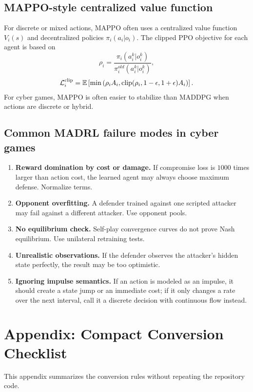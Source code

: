 \documentclass[11pt,a4paper]{article}
\begin{document}
\subsection{MAPPO-style centralized value function}
For discrete or mixed actions, MAPPO often uses a centralized value function $V_i(s)$ and decentralized policies $\pi_i(a_i|o_i)$. The clipped PPO objective for each agent is based on
\begin{equation}
\rho_i=\frac{\pi_i(a_i^k|o_i^k)}{\pi_i^{old}(a_i^k|o_i^k)},
\end{equation}
\begin{equation}
\mathcal{L}_{i}^{\mathrm{clip}}=\mathbb{E}\left[\min\left(\rho_i A_i,\operatorname{clip}(\rho_i,1-\epsilon,1+\epsilon)A_i\right)\right].
\end{equation}
For cyber games, MAPPO is often easier to stabilize than MADDPG when actions are discrete or hybrid.

\subsection{Common MADRL failure modes in cyber games}
\begin{enumerate}
\item \textbf{Reward domination by cost or damage.} If compromise loss is $1000$ times larger than action cost, the learned agent may always choose maximum defense. Normalize terms.
\item \textbf{Opponent overfitting.} A defender trained against one scripted attacker may fail against a different attacker. Use opponent pools.
\item \textbf{No equilibrium check.} Self-play convergence curves do not prove Nash equilibrium. Use unilateral retraining tests.
\item \textbf{Unrealistic observations.} If the defender observes the attacker's hidden state perfectly, the result may be too optimistic.
\item \textbf{Ignoring impulse semantics.} If an action is modeled as an impulse, it should create a state jump or an immediate cost; if it only changes a rate over the next interval, call it a discrete decision with continuous flow instead.
\end{enumerate}


\section{Appendix: Compact Conversion Checklist}\label{app:continuous-impulse-rl}
This appendix summarizes the conversion rules without repeating the repository code.
\end{document}

